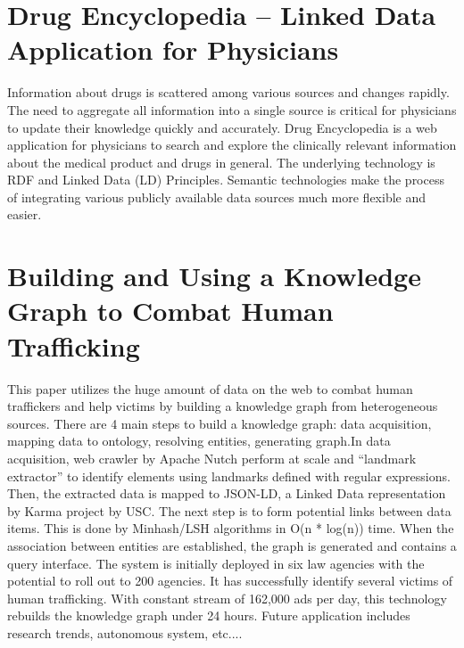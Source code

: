     \section{Drug Encyclopedia – Linked Data Application for Physicians}

    Information about drugs is scattered among various sources and changes rapidly. The need to aggregate all information into a single source is critical for physicians to update their knowledge quickly and accurately.
    Drug Encyclopedia is a web application for physicians to search and explore the clinically relevant information about the medical product and drugs in general. The underlying technology is RDF and Linked Data (LD) Principles. 
    Semantic technologies make the process of integrating various publicly available data sources much more flexible and easier. 

    \section{Building and Using a Knowledge Graph to
    Combat Human Trafficking}

    This paper utilizes the huge amount of data on the web to combat human traffickers and help victims by building a knowledge graph from  heterogeneous sources.
    There are 4 main steps to build a knowledge graph: data acquisition, mapping data to ontology, resolving entities, generating graph.In data acquisition, web crawler by Apache Nutch perform at scale and “landmark extractor” to identify elements using landmarks defined with regular expressions. Then, the extracted data is mapped to JSON-LD, a Linked Data representation by Karma project by USC. The next step is to form potential links between data items. This is done by Minhash/LSH algorithms in O(n * log(n)) time. When the association between entities are established, the graph is generated and contains a query interface.
    The system is initially deployed in six law agencies with the potential to roll out to 200 agencies. It has successfully identify several victims of human trafficking. With constant stream of 162,000 ads per day, this technology rebuilds the knowledge graph under 24 hours. Future application includes research trends, autonomous system, etc....